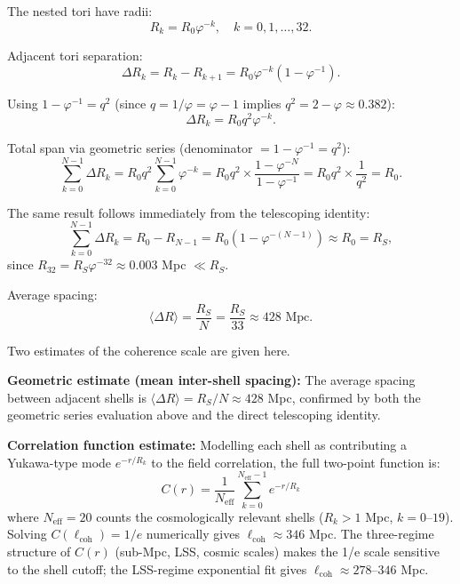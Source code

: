 The nested tori have radii:
\begin{equation}
R_k = R_0\varphi^{-k}, \quad k = 0, 1, \ldots, 32.
\end{equation}

Adjacent tori separation:
\begin{equation}
\Delta R_k = R_k - R_{k+1} = R_0\varphi^{-k}(1 - \varphi^{-1}).
\end{equation}

Using $1 - \varphi^{-1} = q^2$ (since $q = 1/\varphi = \varphi - 1$ implies $q^2 = 2-\varphi \approx 0.382$):
\begin{equation}
\Delta R_k = R_0 q^2 \varphi^{-k}.
\end{equation}

Total span via geometric series (denominator $= 1 - \varphi^{-1} = q^2$):
\begin{equation}
\sum_{k=0}^{N-1} \Delta R_k = R_0 q^2 \sum_{k=0}^{N-1} \varphi^{-k}
  = R_0 q^2 \times \frac{1 - \varphi^{-N}}{1 - \varphi^{-1}}
  = R_0 q^2 \times \frac{1}{q^2} = R_0.
\end{equation}

The same result follows immediately from the telescoping identity:
\begin{equation}
\sum_{k=0}^{N-1} \Delta R_k = R_0 - R_{N-1}
  = R_0\!\left(1 - \varphi^{-(N-1)}\right) \approx R_0 = R_S,
\end{equation}
since $R_{32} = R_S\varphi^{-32} \approx 0.003$ Mpc $\ll R_S$.

Average spacing:
\begin{equation}
\langle \Delta R \rangle = \frac{R_S}{N} = \frac{R_S}{33} \approx 428 \text{ Mpc}.
\end{equation}

Two estimates of the coherence scale are given here.

\textbf{Geometric estimate (mean inter-shell spacing):}
The average spacing between adjacent shells is $\langle \Delta R \rangle = R_S/N \approx 428$ Mpc, confirmed by both the geometric series evaluation above and the direct telescoping identity.

\textbf{Correlation function estimate:}
Modelling each shell as contributing a Yukawa-type mode $e^{-r/R_k}$ to the field correlation, the full two-point function is:
\begin{equation}
C(r) = \frac{1}{N_{\text{eff}}} \sum_{k=0}^{N_{\text{eff}}-1} e^{-r/R_k}
\end{equation}
where $N_{\text{eff}} = 20$ counts the cosmologically relevant shells ($R_k > 1$ Mpc, $k = 0$--$19$). Solving $C(\ell_{\text{coh}}) = 1/e$ numerically gives $\ell_{\text{coh}} \approx 346$ Mpc. The three-regime structure of $C(r)$ (sub-Mpc, LSS, cosmic scales) makes the 1/e scale sensitive to the shell cutoff; the LSS-regime exponential fit gives $\ell_{\text{coh}} \approx 278$--$346$ Mpc.

